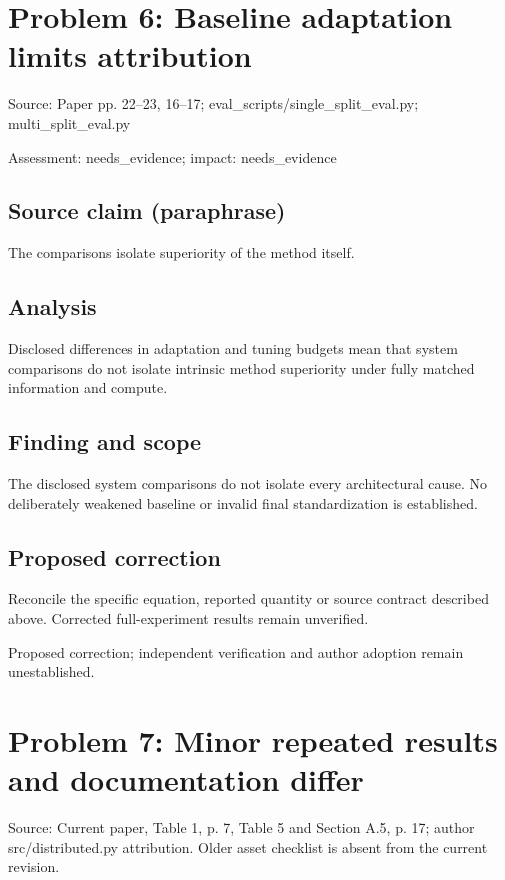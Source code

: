 \documentclass[11pt]{article}
\begin{document}
\section*{Problem 6: Baseline adaptation limits attribution}

Source: Paper pp. 22–23, 16–17; eval\_scripts/single\_split\_eval.py; multi\_split\_eval.py

Assessment: needs\_evidence; impact: needs\_evidence

\subsection*{Source claim (paraphrase)}

The comparisons isolate superiority of the method itself.

\subsection*{Analysis}

Disclosed differences in adaptation and tuning budgets mean that system comparisons do not isolate intrinsic method superiority under fully matched information and compute.

\subsection*{Finding and scope}

The disclosed system comparisons do not isolate every architectural cause. No deliberately weakened baseline or invalid final standardization is established.

\subsection*{Proposed correction}

Reconcile the specific equation, reported quantity or source contract described above. Corrected full-experiment results remain unverified.

Proposed correction; independent verification and author adoption remain unestablished.

\section*{Problem 7: Minor repeated results and documentation differ}

Source: Current paper, Table 1, p. 7, Table 5 and Section A.5, p. 17; author src/distributed.py attribution. Older asset checklist is absent from the current revision.
\end{document}
